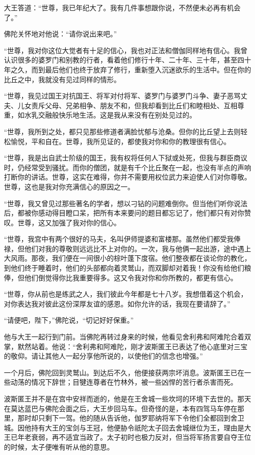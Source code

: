 \documentclass[12pt,twoside,openany]{book}
\begin{document}
大王答道：“世尊，我已年纪大了。我有几件事想跟你说，不然便未必再有机会了。”

佛陀关怀地对他说：“请你说出来吧。”

“世尊，我对你这位大觉者有十足的信心，我也对正法和僧伽同样地有信心。我曾认识很多的婆罗门和别教的行者，看着他们修行十年、二十年、三十年，甚至四十年之久，而到最后他们也终于放弃了修行，重新堕入沉迷欲乐的生活中。但在你的比丘之中，我就没有见过同样的情形。

“世尊，我见过国王对抗国王、将军对付将军、婆罗门与婆罗门斗争、妻子恶骂丈夫、儿女责斥父母、兄弟相争、朋友不和，但我却看到比丘们和睦相处、互相尊重，如水乳交融般快乐地生活。这是我从来没有在别处见过的。

“世尊，我所到之处，都只见那些修道者满脸忧郁与沧桑。但你的比丘望上去则轻松愉悦，平和自在。世尊，我所见证的，都使我对你和你的教理很有信心。

“世尊，我是出自武士阶级的国王，我有权将任何人下狱或处死，但我与群臣商议时，仍经常受到骚扰。而你的僧团，就是有千个比丘聚在一起，也没有半点的声响打断你的讲话。世尊，这实在难得，你并不需要用权位武力来迫使人们对你尊敬。世尊，这也是我对你充满信心的原因之一。

“世尊，我又曾见过那些著名的学者，想以刁钻的问题难倒你。但当他们听你说法后，都被你感动得目瞪口呆，把所有本来要问的题目都忘记了，他们都只有对你赞叹。世尊，这又加强了我对你的信心。

“世尊，我宫中有两个很好的马夫，名叫伊师提婆和富楼那。虽然他们都受我俸禄，但他们对我的尊敬则远远比不上对你的。一次，我与他俩一起出游，途中遇上大风雨。那夜，我们便在一间很小的棕叶蓬下度宿。他们整夜都在谈论你的教化，到他们终于睡着时，他们的头部都向着灵鹫山，而双脚却对着我！你没有给他们粮俸，但他们倒觉得你比我重要得多。这又令我对你和你所教的，都更有信心。

“世尊，你从前也是练武之人，我们彼此今年都是七十八岁。我想借着这个机会，对你表达我对彼此这份深厚友谊的感恩。如你允许的话，我现在要请辞了。”

“请便吧，陛下，”佛陀说，“切记好好保重。”

他与大王一起行到门前。当佛陀再转过身来的时候，他看见舍利弗和阿难陀合着双掌，默然站着。他说：“舍利弗和阿难陀，刚才波斯匿王已表达了他心底里对三宝的敬仰。请让其他人一起分享他所说的，以使他们的信念也增强。”

一个月后，佛陀回到灵鹫山。到达后不久，他便接获两宗坏消息。波斯匿王已在一些动荡的情况下辞世；目犍连尊者在竹林外，被一些凶悍的苦行者杀害而死。

波斯匿王并不是在宫中安祥而逝的，他是在王舍城一些坎坷的环境下去世的。那天在莫达蓝巴与佛陀会面之后，大王步回马车。但奇怪的是，本有四驾马车停在那里，那时却只剩下一驾。他的随从告诉他，伽罗耶纳将军下令他们全都回到舍卫城。因他持有大王的宝剑与王冠，他便胁令祇陀太子回去舍城继位为王，理由是大王已年老衰弱，再不适宜当政了。太子初时也极力反对，但当将军扬言要自夺王位的时候，太子便唯有听从他的意思。
\end{document}
